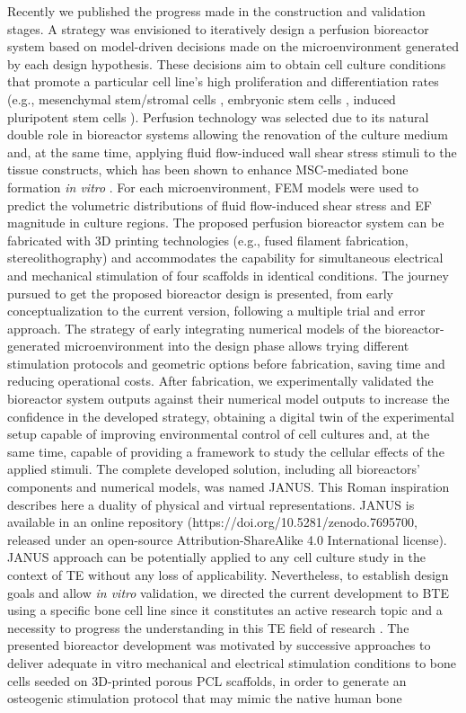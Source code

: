 Recently we published the progress made in the construction and validation stages. A strategy was envisioned to iteratively design a perfusion bioreactor system based on model-driven decisions made on the microenvironment generated by each design hypothesis.  These decisions aim to obtain cell culture conditions that promote a particular cell line's high proliferation and differentiation rates (e.g., mesenchymal stem/stromal cells \cite{Bianconi2023-rs, Alvarez-Barreto2011-lj}, embryonic stem cells \cite{Marolt2012-xc}, induced pluripotent stem cells \cite{De_Peppo2013-dq}). Perfusion technology was selected due to its natural double role in bioreactor systems allowing the renovation of the culture medium and, at the same time, applying fluid flow-induced wall shear stress stimuli to the tissue constructs, which has been shown to enhance MSC-mediated bone formation \textit{in vitro} \cite{Wittkowske2016-xr, Schroder2022-qt, Yamada2022-aq}. For each microenvironment, \acs{FEM} models were used to predict the volumetric distributions of fluid flow-induced shear stress and \acs{EF} magnitude in culture regions. The proposed perfusion bioreactor system can be fabricated with \acs{3D} printing technologies (e.g., fused filament fabrication, stereolithography) and accommodates the capability for simultaneous electrical and mechanical stimulation of four scaffolds in identical conditions. The journey pursued to get the proposed bioreactor design is presented, from early conceptualization to the current version, following a multiple trial and error approach. The strategy of early integrating numerical models of the bioreactor-generated microenvironment into the design phase allows trying different stimulation protocols and geometric options before fabrication, saving time and reducing operational costs. After fabrication, we experimentally validated the bioreactor system outputs against their numerical model outputs to increase the confidence in the developed strategy, obtaining a digital twin of the experimental setup capable of improving environmental control of cell cultures and, at the same time, capable of providing a framework to study the cellular effects of the applied stimuli. The complete developed solution, including all bioreactors' components and numerical models, was named JANUS. This Roman inspiration describes here a duality of physical and virtual representations. JANUS is available in an online repository (https://doi.org/10.5281/zenodo.7695700, released under an open-source Attribution-ShareAlike 4.0 International license). JANUS approach can be potentially applied to any cell culture study in the context of \acs{TE} without any loss of applicability. Nevertheless, to establish design goals and allow \textit{in vitro} validation, we directed the current development to \acs{BTE} using a specific bone cell line since it constitutes an active research topic and a necessity to progress the understanding in this TE field of research \cite{Sladkova2014-yw}. The presented bioreactor development was motivated by successive approaches to deliver adequate in vitro mechanical and electrical stimulation conditions to bone cells seeded on 3D-printed porous PCL scaffolds, in order to generate an osteogenic stimulation protocol that may mimic the native human bone 